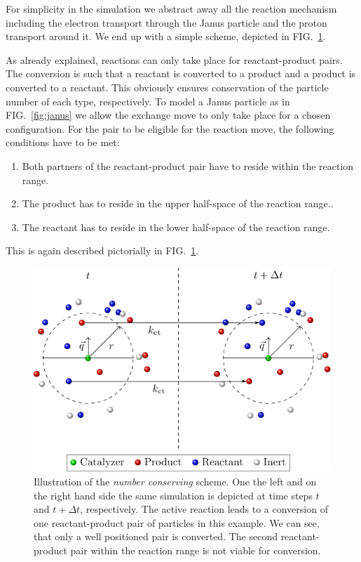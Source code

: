 \documentclass[aip,jcp,reprint,a4paper,onecolumn,nofootinbib,amsmath,amssymb]{revtex4-1}
\begin{document}
For simplicity in the simulation we abstract away all the reaction
mechanism including the electron transport through the Janus particle
and the proton transport around it.  We end up with a simple scheme,
depicted in FIG.~\ref{fig:nc}.

As already explained, reactions can only take place for
reactant-product pairs.  The conversion is such that a reactant is
converted to a product and a product is converted to a reactant.  This
obviously ensures conservation of the particle number of each type,
respectively.  To model a Janus particle as in FIG.~\ref{fig:janus} we
allow the exchange move to only take place for a chosen configuration.
For the pair to be eligible for the reaction move, the following
conditions have to be met:
\begin{enumerate}
\item Both partners of the reactant-product pair have to reside within
  the reaction range.
\item The product has to reside in the upper half-space of the
  reaction range..
\item The reactant has to reside in the lower half-space of the
  reaction range.
\end{enumerate}
This is again described pictorially in FIG.~\ref{fig:nc}.

\begin{figure}
  \centering
  \includegraphics{FIGURES/number-conserving}
  \caption{Illustration of the \emph{number conserving} scheme.  One
    the left and on the right hand side the same simulation is
    depicted at time steps $t$ and $t+\Delta t$, respectively.  The
    active reaction leads to a conversion of one reactant-product pair
    of particles in this example.  We can see, that only a well
    positioned pair is converted.  The second reactant-product pair
    within the reaction range is not viable for conversion.}
  \label{fig:nc}
\end{figure}
\end{document}
